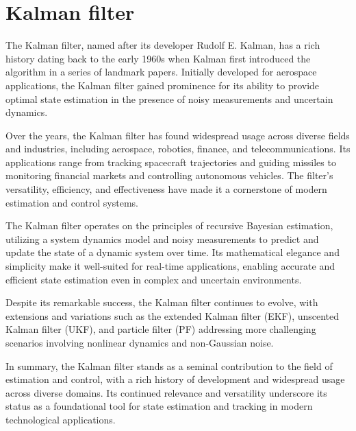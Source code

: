 \section{Kalman filter}
    \label{Kalman}
The Kalman filter, named after its developer Rudolf E. Kalman, has a rich history dating back to the early 1960s when Kalman first introduced the algorithm in a series of landmark papers. Initially developed for aerospace applications, the Kalman filter gained prominence for its ability to provide optimal state estimation in the presence of noisy measurements and uncertain dynamics.

Over the years, the Kalman filter has found widespread usage across diverse fields and industries, including aerospace, robotics, finance, and telecommunications. Its applications range from tracking spacecraft trajectories and guiding missiles to monitoring financial markets and controlling autonomous vehicles. The filter's versatility, efficiency, and effectiveness have made it a cornerstone of modern estimation and control systems.

The Kalman filter operates on the principles of recursive Bayesian estimation, utilizing a system dynamics model and noisy measurements to predict and update the state of a dynamic system over time. Its mathematical elegance and simplicity make it well-suited for real-time applications, enabling accurate and efficient state estimation even in complex and uncertain environments.

Despite its remarkable success, the Kalman filter continues to evolve, with extensions and variations such as the extended Kalman filter (EKF), unscented Kalman filter (UKF), and particle filter (PF) addressing more challenging scenarios involving nonlinear dynamics and non-Gaussian noise.

In summary, the Kalman filter stands as a seminal contribution to the field of estimation and control, with a rich history of development and widespread usage across diverse domains. Its continued relevance and versatility underscore its status as a foundational tool for state estimation and tracking in modern technological applications.

